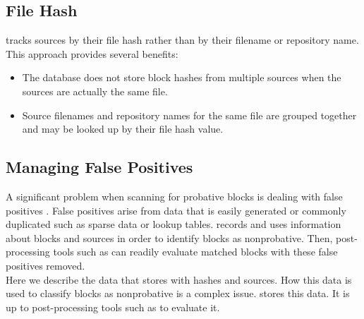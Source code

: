\documentclass[11pt,fleqn]{article} %
\begin{document}
\subsection{File Hash}
\hdb tracks sources by their file hash rather than by their filename
or repository name.  This approach provides several benefits:

\begin{itemize}
\item The database does not store block hashes from multiple sources
when the sources are actually the same file.
\item Source filenames and repository names for the same file are grouped
together and may be looked up by their file hash value.
\end{itemize}

\subsection{Managing False Positives}
A significant problem when scanning for probative blocks is dealing with false positives \cite{hashBasedCarving}. False positives arise from data that is easily generated or commonly duplicated such as sparse data or lookup tables. \hdb records and uses information about blocks and sources in order to identify blocks as nonprobative. Then, post-processing tools such as \sscope can readily evaluate matched blocks with these false positives removed.\\

Here we describe the data that \hdb stores with hashes and sources. How this data is used to classify blocks as nonprobative is a complex issue. \hdb stores this data. It is up to post-processing tools such as \sscope to evaluate it.\\
\end{document}
